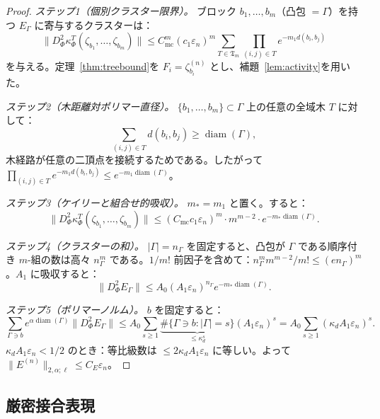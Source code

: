 \documentclass[12pt]{article}
\theoremstyle{plain}
\theoremstyle{definition}
\numberwithin{equation}{section}
\newcommand{\diam}{\operatorname{diam}}
\begin{document}
\begin{proof}
\emph{ステップ1（個別クラスター限界）。} ブロック $b_1,\ldots,b_m$（凸包 $=\Gamma$）を持つ $E_\Gamma$ に寄与するクラスターは：
\begin{equation}
\|D_\Phi^2\kappa_\Phi^T(\zeta_{b_1},\ldots,\zeta_{b_m})\|\leq C_{\mathrm{mc}}^m(c_1\varepsilon_n)^m\sum_{T\in\mathfrak{T}_m}\prod_{(i,j)\in T}e^{-m_1 d(b_i,b_j)}
\end{equation}
を与える。定理~\ref{thm:treebound}を $F_i=\zeta_{b_i}^{(n)}$ とし、補題~\ref{lem:activity}を用いた。

\emph{ステップ2（木距離対ポリマー直径）。} $\{b_1,\ldots,b_m\}\subset\Gamma$ 上の任意の全域木 $T$ に対して：
\begin{equation}
\sum_{(i,j)\in T}d(b_i,b_j)\geq\diam(\Gamma),
\end{equation}
木経路が任意の二頂点を接続するためである。したがって $\prod_{(i,j)\in T}e^{-m_1 d(b_i,b_j)}\leq e^{-m_1\diam(\Gamma)}$。

\emph{ステップ3（ケイリーと組合せ的吸収）。} $m_*=m_1$ と置く。すると：
\begin{equation}
\|D_\Phi^2\kappa_\Phi^T(\zeta_{b_1},\ldots,\zeta_{b_m})\|\leq(C_{\mathrm{mc}}c_1\varepsilon_n)^m\cdot m^{m-2}\cdot e^{-m_*\diam(\Gamma)}.
\end{equation}

\emph{ステップ4（クラスターの和）。} $|\Gamma|=n_\Gamma$ を固定すると、凸包が $\Gamma$ である順序付き $m$-組の数は高々 $n_\Gamma^m$ である。$1/m!$ 前因子を含めて：$n_\Gamma^m m^{m-2}/m!\leq(en_\Gamma)^m$。$A_1$ に吸収すると：
\begin{equation}
\|D_\Phi^2 E_\Gamma\|\leq A_0(A_1\varepsilon_n)^{n_\Gamma}e^{-m_*\diam(\Gamma)}.
\end{equation}

\emph{ステップ5（ポリマーノルム）。} $b$ を固定すると：
\begin{equation}
\sum_{\Gamma\ni b}e^{\alpha\diam(\Gamma)}\|D_\Phi^2 E_\Gamma\|\leq A_0\sum_{s\geq 1}\underbrace{\#\{\Gamma\ni b:|\Gamma|=s\}}_{\leq\kappa_d^s}(A_1\varepsilon_n)^s = A_0\sum_{s\geq 1}(\kappa_d A_1\varepsilon_n)^s.
\end{equation}
$\kappa_d A_1\varepsilon_n<1/2$ のとき：等比級数は $\leq 2\kappa_d A_1\varepsilon_n$ に等しい。よって $\|E^{(n)}\|_{2,\alpha;\ell}\leq C_E\varepsilon_n$。
\end{proof}

\subsection{厳密接合表現}
\end{document}
